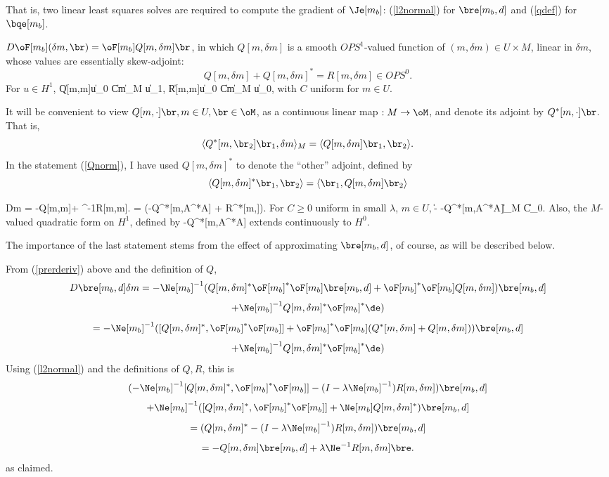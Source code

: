  That is, two linear least squares solves are required to compute the gradient of $\Je[m_b]$: (\ref{l2normal}) for $\bre[m_b,d]$ and (\ref{qdef}) for $\bqe[m_b]$.

 $D\oF[m_b](\delta m,\br) = \oF[m_b]Q[m,\delta m]\br$, in which $Q[m,\delta m]$ is a smooth $OPS^1$-valued function of $(m,\delta m) \in U \times M$, linear in $\delta m$, whose values are essentially skew-adjoint:
\[
Q[m,\delta m] + Q[m,\delta m]^* = R[m,\delta m] \in OPS^0.
\]
For $u \in H^1$, 
\be
\label{Qnorm}
\|Q[m,\delta m]u\|_0 \le C\|\delta m\|_M \|u\|_1,
\ee
\be
\label{Rnorm}
\|R[m,\delta m]u\|_0 \le C\|\delta m\|_M \|u\|_0,
\ee
with $C$ uniform for $m\in U$.

It will be convenient to view $Q[m,\cdot]\br, m\in U, \br \in \oM$, as a continuous linear map $:M \rightarrow \oM$, and denote its adjoint by $Q^*[m,\cdot]\br$. That is,
\[
\langle Q^*[m,\br_2]\br_1,\delta m\rangle_M = \langle Q[m,\delta m]\br_1,\br_2\rangle.
\]
In the statement (\ref{Qnorm}), I have used $Q[m,\delta m]^*$ to denote the ``other'' adjoint, defined by 
\[
\langle Q[m,\delta m]^*\br_1,\br_2\rangle = \langle \br_1,Q[m,\delta m]\br_2\rangle
\]

\be
\label{qrderiv}
D\bre[m_b,d]\delta m = -Q[m,\delta m]\bre[m_b,d] + \lambda \Ne^{-1}R[m,\delta m]\bre[m_b,d].
\ee
\be
\label{eqn:gradq}
\nabla \Je[m_b] = (-Q^*[m,A^*A\bre[m_b,d]] + \lambda R^*[m,\bqe[m_b]])\bre[m_b,d].
\ee
For $C \ge 0$ uniform in small $\lambda$, $m \in U$,
\be
\label{eqn:firstgradest}
\|\nabla \Je[m_b] - -Q^*[m,A^*A\bre[m_b,d]]\bre[m_b,d] \|_M \le C\lambda \|\de\|_0.
\ee
Also, the $M$-valued quadratic form on $H^1$, defined by
\be
\label{qquad}
\br \mapsto -Q^*[m,A^*A\br]\br
\ee
extends continuously to $H^0$.

 The importance of the last statement stems from the effect of approximating $\bre[m_b,d]$, of course, as will be described below.
 
 From (\ref{prerderiv}) above and the definition of $Q$,
\[
D\bre[m_b,d]\delta m = 
-\Ne[m_b]^{-1}(Q[m,\delta m]^*\oF[m_b]^*\oF[m_b]\bre[m_b,d] + \oF[m_b]^*\oF[m_b]Q[m,\delta m])\bre[m_b,d]
\]
\[
 + \Ne[m_b]^{-1}Q[m,\delta m]^*\oF[m_b]^*\de)
\]
\[
= 
-\Ne[m_b]^{-1}([Q[m,\delta m]^*,\oF[m_b]^*\oF[m_b]] + \oF[m_b]^*\oF[m_b] (Q^*[m,\delta m]+Q[m,\delta m]))\bre[m_b,d]
\]
\[
 + \Ne[m_b]^{-1}Q[m,\delta m]^*\oF[m_b]^*\de)
\]
Using (\ref{l2normal}) and the definitions of $Q,R$, this is
\[
(-\Ne[m_b]^{-1}[Q[m,\delta m]^*,\oF[m_b]^*\oF[m_b]]-(I-\lambda \Ne[m_b]^{-1})R[m,\delta m])\bre[m_b,d]
\]
\[
+ \Ne[m_b]^{-1}([Q[m,\delta m]^*,\oF[m_b]^*\oF[m_b]] + \Ne[m_b]Q[m,\delta m]^*)\bre[m_b,d]
\]
\[
=(Q[m,\delta m]^*-(I-\lambda \Ne[m_b]^{-1})R[m,\delta m])\bre[m_b,d]
\]
\[
= -Q[m,\delta m]\bre[m_b,d] + \lambda \Ne^{-1}R[m,\delta m]\bre.
\]
as claimed. 


